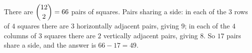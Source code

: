 There are $\dbinom{12}{2}=66$ pairs of squares. Pairs sharing a side: in each of the $3$ rows of $4$ squares there are $3$ horizontally adjacent pairs, giving $9$; in each of the $4$ columns of $3$ squares there are $2$ vertically adjacent pairs, giving $8$. So $17$ pairs share a side, and the answer is $66-17=\boxed{49}$.
